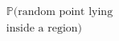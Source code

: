 \documentclass[preview]{standalone}
\begin{document}
\begin{align*}
\mathbb{P} ( \text{random point lying}\\ \text{inside a  region} )
\end{align*}
\end{document}

